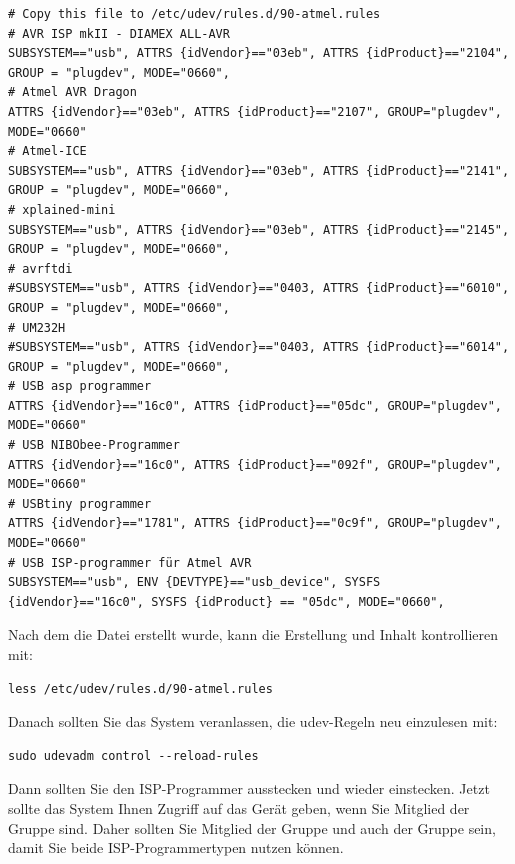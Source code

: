 \begin{tiny}
\begin{verbatim}
# Copy this file to /etc/udev/rules.d/90-atmel.rules
# AVR ISP mkII - DIAMEX ALL-AVR
SUBSYSTEM=="usb", ATTRS {idVendor}=="03eb", ATTRS {idProduct}=="2104", GROUP = "plugdev", MODE="0660",
# Atmel AVR Dragon
ATTRS {idVendor}=="03eb", ATTRS {idProduct}=="2107", GROUP="plugdev", MODE="0660"
# Atmel-ICE
SUBSYSTEM=="usb", ATTRS {idVendor}=="03eb", ATTRS {idProduct}=="2141", GROUP = "plugdev", MODE="0660",
# xplained-mini
SUBSYSTEM=="usb", ATTRS {idVendor}=="03eb", ATTRS {idProduct}=="2145", GROUP = "plugdev", MODE="0660",
# avrftdi
#SUBSYSTEM=="usb", ATTRS {idVendor}=="0403, ATTRS {idProduct}=="6010", GROUP = "plugdev", MODE="0660",
# UM232H
#SUBSYSTEM=="usb", ATTRS {idVendor}=="0403, ATTRS {idProduct}=="6014", GROUP = "plugdev", MODE="0660",
# USB asp programmer
ATTRS {idVendor}=="16c0", ATTRS {idProduct}=="05dc", GROUP="plugdev", MODE="0660"
# USB NIBObee-Programmer
ATTRS {idVendor}=="16c0", ATTRS {idProduct}=="092f", GROUP="plugdev", MODE="0660"
# USBtiny programmer
ATTRS {idVendor}=="1781", ATTRS {idProduct}=="0c9f", GROUP="plugdev", MODE="0660"
# USB ISP-programmer für Atmel AVR
SUBSYSTEM=="usb", ENV {DEVTYPE}=="usb_device", SYSFS {idVendor}=="16c0", SYSFS {idProduct} == "05dc", MODE="0660",
\end{verbatim}
\end{tiny}
\vspace*{-.8em}
Nach dem die Datei erstellt wurde, kann die Erstellung und Inhalt kontrollieren mit:
\begin{large} \vspace{-0.4em} \begin{verbatim}
less /etc/udev/rules.d/90-atmel.rules 
\end{verbatim} \end{large}
Danach sollten Sie das System veranlassen, die udev-Regeln neu einzulesen mit:
\begin{large} \vspace{-0.4em} \begin{verbatim}
sudo udevadm control --reload-rules
\end{verbatim} \end{large}
Dann sollten Sie den ISP-Programmer ausstecken und wieder einstecken.
Jetzt sollte das System Ihnen Zugriff auf das Gerät geben, wenn Sie Mitglied der Gruppe 
sind.
Daher sollten Sie Mitglied der Gruppe  und auch der Gruppe 
sein, damit Sie beide ISP-Programmertypen nutzen können.

